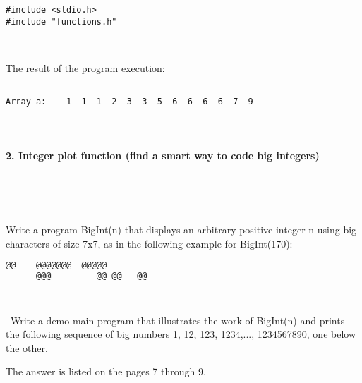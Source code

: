 \documentclass{article}
\begin{document}
	\begin{verbatim} 
#include <stdio.h>
#include "functions.h"

\end{verbatim}




	
	\rmfamily\
	
		\noindent The result of the program execution:
		
	\ttfamily
	\begin{lstlisting}[language=bash]

Array a:    1  1  1  2  3  3  5  6  6  6  6  7  9

	\end{lstlisting}
	
	
\paragraph{}\

	
	
	\rmfamily
	
	\paragraph{2. Integer plot function (find a smart way to code big integers) }\
	
	\rmfamily\
	
		Write a program BigInt(n) that displays an arbitrary positive integer n using big characters of size 7x7, as in the following example for BigInt(170):
				
	\ttfamily
	\begin{lstlisting}[language=bash]		
	   @@ 	 @@@@@@@  @@@@@  
	  @@@  	      @@ @@   @@ 

		 
	\end{lstlisting}
	
	\rmfamily\
	Write a demo main program that illustrates the work of BigInt(n) and prints the following sequence of big numbers 1, 12, 123, 1234,..., 1234567890, one below the other.
	\newline
	
	The answer is listed on the pages 7 through 9.
	
	
\paragraph{}\
\paragraph{}\
\end{document}
